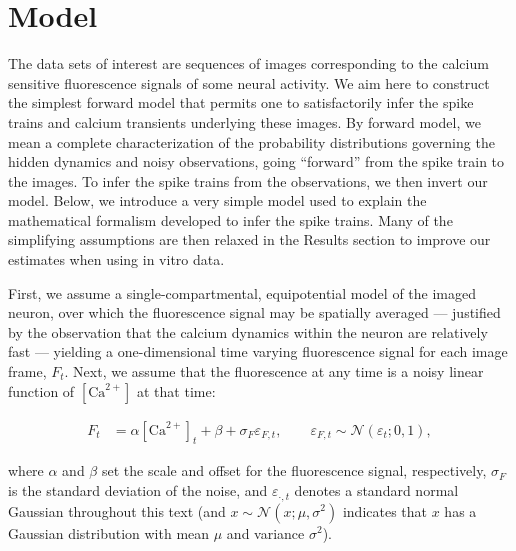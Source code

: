 \documentclass[10pt]{article}
\newcommand{\Ca}{[\text{Ca}^{2+}]}
\begin{document}
\section*{Model} \label{sec:model}

The data sets of interest are sequences of images corresponding to the calcium sensitive fluorescence signals of some neural activity. We aim here to construct the simplest forward model that permits one to satisfactorily infer the spike trains and calcium transients underlying these images. By forward model, we mean a complete characterization of the probability distributions governing the hidden dynamics and noisy observations, going ``forward'' from the spike train to the images. To infer the spike trains from the observations, we then invert our model. Below, we introduce a very simple model used to explain the mathematical formalism developed to infer the spike trains. Many of the simplifying assumptions are then relaxed in the Results section to improve our estimates when using in vitro data.  %

First, we assume a single-compartmental, equipotential model of the imaged neuron, over which the fluorescence signal may be spatially averaged --- justified by the observation that the calcium dynamics within the neuron are relatively fast \cite{SabatiniRegehr98, MajewskaYuste00} --- yielding a one-dimensional time varying fluorescence signal for each image frame, $F_t$.  Next, we assume that the fluorescence at any time is a noisy linear function of $\Ca$ at that time:

\begin{align} \label{eq:F_t}
F_t &= \alpha \Ca_t + \beta + \sigma_F \varepsilon_{F,t}, \qquad \varepsilon_{F,t} \sim \mathcal{N}(\varepsilon_t; 0,1),
\end{align}

\noindent where $\alpha$ and $\beta$ set the scale and offset for the fluorescence signal, respectively, $\sigma_F$ is the standard deviation of the noise, and  $\varepsilon_{\cdot,t}$ denotes a standard normal Gaussian throughout this text (and $x \sim \mathcal{N}(x; \mu,\sigma^2)$ indicates that $x$ has a Gaussian distribution with mean $\mu$ and variance $\sigma^2$). %
\end{document}
